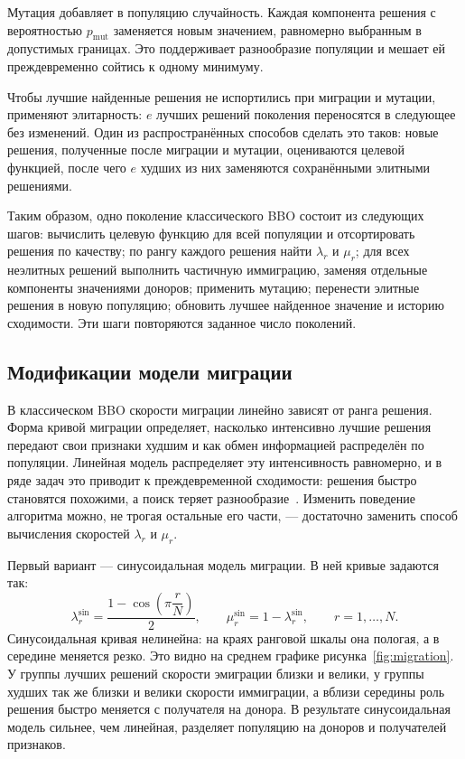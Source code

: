 \documentclass[14pt, a4paper]{extarticle}
\begin{document}
Мутация добавляет в популяцию случайность. Каждая компонента решения с
вероятностью $p_{\text{mut}}$ заменяется новым значением, равномерно выбранным
в допустимых границах. Это поддерживает разнообразие популяции и мешает ей
преждевременно сойтись к одному минимуму.

Чтобы лучшие найденные решения не испортились при миграции и мутации, применяют
элитарность: $e$ лучших решений поколения переносятся в следующее без изменений.
Один из распространённых способов сделать это таков: новые решения, полученные
после миграции и мутации, оцениваются целевой функцией, после чего $e$ худших из
них заменяются сохранёнными элитными решениями.

Таким образом, одно поколение классического BBO состоит из следующих шагов:
вычислить целевую функцию для всей популяции и отсортировать решения по
качеству; по рангу каждого решения найти $\lambda_r$ и $\mu_r$; для всех
неэлитных решений выполнить частичную иммиграцию, заменяя отдельные компоненты
значениями доноров; применить мутацию; перенести элитные решения в новую
популяцию; обновить лучшее найденное значение и историю сходимости. Эти шаги
повторяются заданное число поколений.

\subsection{Модификации модели миграции}
\label{subsec:migration}

В классическом BBO скорости миграции линейно зависят от ранга решения. Форма
кривой миграции определяет, насколько интенсивно лучшие решения передают свои
признаки худшим и как обмен информацией распределён по популяции. Линейная
модель распределяет эту интенсивность равномерно, и в ряде задач это приводит
к преждевременной сходимости: решения быстро становятся похожими, а поиск теряет
разнообразие~\cite{karpenko2018operators}. Изменить поведение алгоритма можно,
не трогая остальные его части, --- достаточно заменить способ вычисления
скоростей $\lambda_r$ и $\mu_r$.

Первый вариант --- синусоидальная модель миграции. В ней кривые задаются так:
\begin{equation}\label{eq:sin-rates}
  \lambda_r^{\text{sin}} = \frac{1 - \cos\!\left(\pi \dfrac{r}{N}\right)}{2},
  \qquad
  \mu_r^{\text{sin}} = 1 - \lambda_r^{\text{sin}},
  \qquad r = 1, \dots, N.
\end{equation}
Синусоидальная кривая нелинейна: на краях ранговой шкалы она пологая, а в
середине меняется резко. Это видно на среднем графике
рисунка~\ref{fig:migration}. У группы лучших решений скорости эмиграции близки и
велики, у группы худших так же близки и велики скорости иммиграции, а вблизи
середины роль решения быстро меняется с получателя на донора. В результате
синусоидальная модель сильнее, чем линейная, разделяет популяцию на доноров и
получателей признаков.
\end{document}
